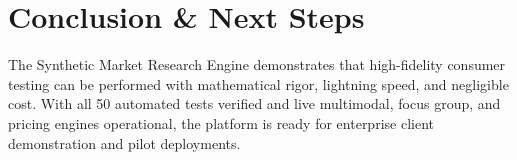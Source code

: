 \documentclass[11pt,a4paper]{article}
\begin{document}
\section{Conclusion \& Next Steps}
The Synthetic Market Research Engine demonstrates that high-fidelity consumer testing can be performed with mathematical rigor, lightning speed, and negligible cost. With all 50 automated tests verified and live multimodal, focus group, and pricing engines operational, the platform is ready for enterprise client demonstration and pilot deployments.
\end{document}
